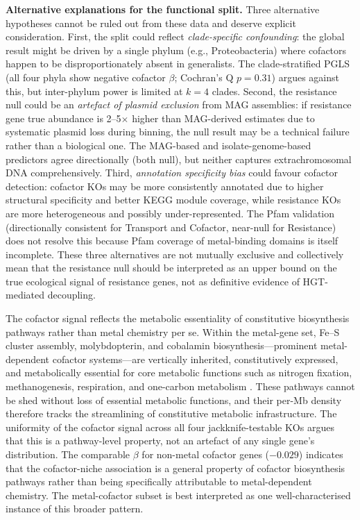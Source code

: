 \documentclass[times]{zHenriquesLab-StyleBioRxiv}
\begin{document}
\textbf{Alternative explanations for the functional split.}
Three alternative hypotheses cannot be ruled out from these data and
deserve explicit consideration. First, the split could reflect \emph{clade-specific
confounding}: the global result might be driven by a single phylum (e.g.,
Proteobacteria) where cofactors happen to be disproportionately absent in
generalists. The clade-stratified PGLS (all four phyla show negative cofactor
$\beta$; Cochran's Q $p = 0.31$) argues against this, but inter-phylum power
is limited at $k = 4$ clades. Second, the resistance null could be an
\emph{artefact of plasmid exclusion} from MAG assemblies: if resistance gene
true abundance is 2--5$\times$ higher than MAG-derived estimates due to
systematic plasmid loss during binning, the null result may be a technical
failure rather than a biological one. The MAG-based and isolate-genome-based
predictors agree directionally (both null), but neither captures extrachromosomal
DNA comprehensively. Third, \emph{annotation specificity bias} could favour
cofactor detection: cofactor KOs may be more consistently annotated due to
higher structural specificity and better KEGG module coverage, while resistance
KOs are more heterogeneous and possibly under-represented. The Pfam validation
(directionally consistent for Transport and Cofactor, near-null for Resistance)
does not resolve this because Pfam coverage of metal-binding domains is itself
incomplete. These three alternatives are not mutually exclusive and collectively
mean that the resistance null should be interpreted as an upper bound on the
true ecological signal of resistance genes, not as definitive evidence of
HGT-mediated decoupling.

The cofactor signal reflects the metabolic essentiality of constitutive
biosynthesis pathways rather than metal chemistry per se. Within the metal-gene
set, Fe--S cluster assembly, molybdopterin, and cobalamin
biosynthesis---prominent metal-dependent cofactor systems---are vertically
inherited, constitutively expressed, and metabolically essential for core
metabolic functions such as nitrogen fixation, methanogenesis, respiration, and
one-carbon metabolism \cite{lill2009,lemire2013,braymer2020,mettert2015,lu2019}. These pathways cannot be shed
without loss of essential metabolic functions, and their per-Mb density
therefore tracks the streamlining of constitutive metabolic infrastructure.
The uniformity of the cofactor signal across all four jackknife-testable KOs
argues that this is a pathway-level property, not an artefact of any single
gene's distribution. The comparable $\beta$ for non-metal cofactor genes
($-0.029$) indicates that the cofactor-niche association is a general property
of cofactor biosynthesis pathways rather than being specifically attributable to
metal-dependent chemistry. The metal-cofactor subset is best interpreted as one
well-characterised instance of this broader pattern.
\end{document}
